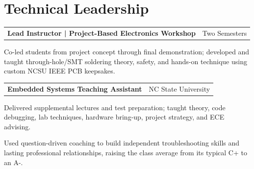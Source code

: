 \documentclass[10pt,letterpaper]{article}
\makeatletter
\newcommand{\resumeentry}[3]{%
  \begin{tabularx}{\textwidth}{@{}Xr@{}}
    \textbf{#1} & #2
  \end{tabularx}\vspace{-0.08cm}
  #3
}
\makeatother
\begin{document}
\section{Technical Leadership}
\resumeentry{Lead Instructor | Project-Based Electronics Workshop}{Two Semesters}{
\begin{resumebullets}
  \item Co-led students from project concept through final demonstration; developed and taught through-hole/SMT soldering theory, safety, and hands-on technique using custom NCSU IEEE PCB keepsakes.
\end{resumebullets}}
\resumeentry{Embedded Systems Teaching Assistant}{NC State University}{
\begin{resumebullets}
  \item Delivered supplemental lectures and test preparation; taught theory, code debugging, lab techniques, hardware bring-up, project strategy, and ECE advising.
  \item Used question-driven coaching to build independent troubleshooting skills and lasting professional relationships, raising the class average from its typical C+ to an A-.
\end{resumebullets}}
\end{document}
